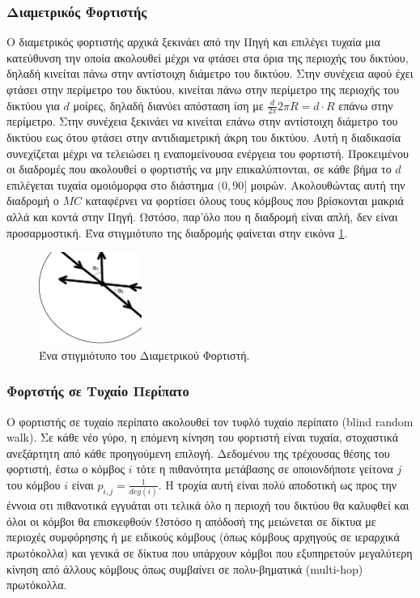 \subsubsection{Διαμετρικός Φορτιστής}
Ο διαμετρικός φορτιστής αρχικά ξεκινάει από την Πηγή και επιλέγει τυχαία μια κατεύθυνση την οποία ακολουθεί μέχρι να φτάσει στα όρια της περιοχής του δικτύου, δηλαδή
κινείται πάνω στην αντίστοιχη διάμετρο του δικτύου. Στην συνέχεια αφού έχει φτάσει στην περίμετρο του δικτύου, κινείται πάνω στην περίμετρο της περιοχής του δικτύου
για $d$ μοίρες, δηλαδή διανύει απόσταση ίση με $\frac{d}{2\pi}2\pi R = d\cdot R$ επάνω στην περίμετρο. Στην συνέχεια ξεκινάει να κινείται επάνω στην αντίστοιχη
διάμετρο του δικτύου εως ότου φτάσει στην αντιδιαμετρική άκρη του δικτύου. Αυτή η διαδικασία συνεχίζεται μέχρι να τελειώσει η εναπομείνουσα ενέργεια του φορτιστή.
Προκειμένου οι διαδρομές που ακολουθεί ο φορτιστής να μην επικαλύπτονται, σε κάθε βήμα το $d$ επιλέγεται τυχαία ομοιόμορφα στο διάστημα $(0,90]$ μοιρών. Ακολουθώντας
αυτή την διαδρομή ο $MC$ καταφέρνει να φορτίσει όλους τους κόμβους που βρίσκονται μακριά αλλά και κοντά στην Πηγή. Ωστόσο, παρ'όλο που η διαδρομή είναι απλή, δεν
είναι προσαρμοστική. Ένα στιγμιότυπο της διαδρομής φαίνεται στην εικόνα \ref{fig:diameter_charger}.
\vspace{0.9cm}
\begin{figure}[h]
	\centering
	\includegraphics[width=0.3\textwidth]{images/diameter.eps}
	\caption{Ένα στιγμιότυπο του Διαμετρικού Φορτιστή.}
	\label{fig:diameter_charger}
\end{figure}


\subsubsection{Φορτστής σε Τυχαίο Περίπατο}
Ο φορτιστής σε τυχαίο περίπατο ακολουθεί τον τυφλό τυχαίο περίπατο (blind random walk). Σε κάθε νέο γύρο, η επόμενη κίνηση του φορτιστή είναι τυχαία, στοχαστικά
ανεξάρτητη από κάθε προηγούμενη επιλογή. Δεδομένου της τρέχουσας θέσης του φορτιστή, έστω ο κόμβος $i$ τότε η πιθανότητα μετάβασης σε οποιονδήποτε γείτονα $j$ του
κόμβου $i$ είναι $p_{i,j} =\frac{1}{deg(i)}$. Η τροχία αυτή είναι πολύ αποδοτική ως προς την έννοια οτι πιθανοτικά εγγυάται οτι τελικά όλο η περιοχή του δικτύου θα
καλυφθεί και όλοι οι κόμβοι θα επισκεφθούν Ωστόσο η απόδοσή της μειώνεται σε δίκτυα με περιοχές συμφόρησης ή με ειδικούς κόμβους (όπως κόμβους αρχηγούς σε
ιεραρχικά πρωτόκολλα) και γενικά σε δίκτυα που υπάρχουν κόμβοι που εξυπηρετούν μεγαλύτερη κίνηση από άλλους κόμβους όπως συμβαίνει σε πολυ-βηματικά (multi-hop)
πρωτόκολλα.


